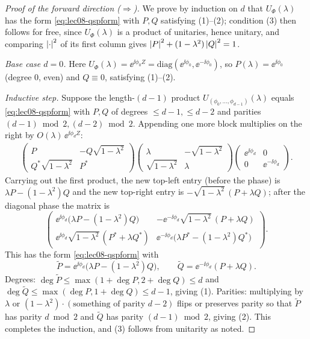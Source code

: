 \begin{proof}[Proof of the forward direction ($\Rightarrow$)]
We prove by induction on $d$ that $U_\Phi(\lambda)$ has the form
\eqref{eq:lec08-qspform} with $P,Q$ satisfying (1)--(2); condition (3) then follows
for free, since $U_\Phi(\lambda)$ is a product of unitaries, hence unitary, and
comparing $\left\lvert \cdot \right\rvert^2$ of its first column gives
$\left\lvert P \right\rvert^2+(1-\lambda^2)\left\lvert Q \right\rvert^2=1$.

\emph{Base case $d=0$.} Here $U_\Phi(\lambda)=\ee^{\ii\phi_0 Z}
=\mathrm{diag}(\ee^{\ii\phi_0},\ee^{-\ii\phi_0})$, so $P(\lambda)=\ee^{\ii\phi_0}$
(degree $0$, even) and $Q\equiv0$, satisfying (1)--(2).

\emph{Inductive step.} Suppose the length-$(d-1)$ product
$U_{(\phi_0,\dots,\phi_{d-1})}(\lambda)$ equals \eqref{eq:lec08-qspform} with
$P,Q$ of degrees $\le d-1,\le d-2$ and parities $(d-1)\bmod2,(d-2)\bmod2$. Appending
one more block multiplies on the right by $O(\lambda)\,\ee^{\ii\phi_d Z}$:
\begin{align}
  \begin{pmatrix}P&-Q\sqrt{1-\lambda^2}\\ Q^*\sqrt{1-\lambda^2}&P^*\end{pmatrix}
  \begin{pmatrix}\lambda&-\sqrt{1-\lambda^2}\\ \sqrt{1-\lambda^2}&\lambda\end{pmatrix}
  \begin{pmatrix}\ee^{\ii\phi_d}&0\\0&\ee^{-\ii\phi_d}\end{pmatrix}.
  \label{eq:lec08-indstep}
\end{align}
Carrying out the first product, the new top-left entry (before the phase) is
$\lambda P-(1-\lambda^2)Q$ and the new top-right entry is
$-\sqrt{1-\lambda^2}\,(P+\lambda Q)$; after the diagonal phase the matrix is
\begin{equation}
  \begin{pmatrix}
    \ee^{\ii\phi_d}\bigl(\lambda P-(1-\lambda^2)Q\bigr) &
    -\ee^{-\ii\phi_d}\sqrt{1-\lambda^2}\,(P+\lambda Q)\\[4pt]
    \ee^{\ii\phi_d}\sqrt{1-\lambda^2}\,(P^*+\lambda Q^*)&
    \ee^{-\ii\phi_d}\bigl(\lambda P^*-(1-\lambda^2)Q^*\bigr)
  \end{pmatrix}.
  \label{eq:lec08-indresult}
\end{equation}
This has the form \eqref{eq:lec08-qspform} with
\begin{equation}
  \widetilde P=\ee^{\ii\phi_d}\bigl(\lambda P-(1-\lambda^2)Q\bigr),\qquad
  \widetilde Q=\ee^{-\ii\phi_d}(P+\lambda Q).
  \label{eq:lec08-newPQ}
\end{equation}
Degrees: $\deg\widetilde P\le\max(1+\deg P,2+\deg Q)\le d$ and
$\deg\widetilde Q\le\max(\deg P,1+\deg Q)\le d-1$, giving (1). Parities: multiplying
by $\lambda$ or $(1-\lambda^2)\cdot(\text{something of parity }d-2)$ flips or
preserves parity so that $\widetilde P$ has parity $d\bmod2$ and $\widetilde Q$ has
parity $(d-1)\bmod2$, giving (2). This completes the induction, and (3) follows from
unitarity as noted.
\end{proof}

